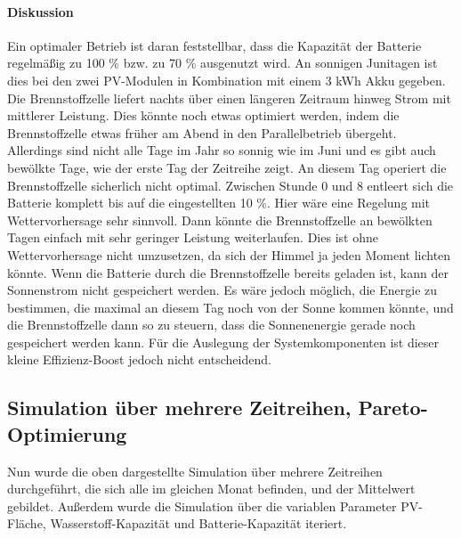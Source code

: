 \paragraph{Diskussion}
Ein optimaler Betrieb ist daran feststellbar, dass die Kapazität der Batterie regelmäßig zu 100 \% bzw. zu 70 \% ausgenutzt wird. An sonnigen Junitagen ist dies bei den zwei PV-Modulen in Kombination mit einem 3 kWh Akku gegeben. Die Brennstoffzelle liefert nachts über einen längeren Zeitraum hinweg Strom mit mittlerer Leistung. Dies könnte noch etwas optimiert werden, indem die Brennstoffzelle etwas früher am Abend in den Parallelbetrieb übergeht. Allerdings sind nicht alle Tage im Jahr so sonnig wie im Juni und es gibt auch bewölkte Tage, wie der erste Tag der Zeitreihe zeigt. An diesem Tag operiert die Brennstoffzelle sicherlich nicht optimal. Zwischen Stunde 0 und 8 entleert sich die Batterie komplett bis auf die eingestellten 10 \%. Hier wäre eine Regelung mit Wettervorhersage sehr sinnvoll. Dann könnte die Brennstoffzelle an bewölkten Tagen einfach mit sehr geringer Leistung weiterlaufen. Dies ist ohne Wettervorhersage nicht umzusetzen, da sich der Himmel ja jeden Moment lichten könnte. Wenn die Batterie durch die Brennstoffzelle bereits geladen ist, kann der Sonnenstrom nicht gespeichert werden. Es wäre jedoch möglich, die Energie zu bestimmen, die maximal an diesem Tag noch von der Sonne kommen könnte, und die Brennstoffzelle dann so zu steuern, dass die Sonnenenergie gerade noch gespeichert werden kann. Für die Auslegung der Systemkomponenten ist dieser kleine Effizienz-Boost jedoch nicht entscheidend.

\subsection{Simulation über mehrere Zeitreihen, Pareto-Optimierung}

Nun wurde die oben dargestellte Simulation über mehrere Zeitreihen durchgeführt, die sich alle im gleichen Monat befinden, und der Mittelwert gebildet. Außerdem wurde die Simulation über die variablen Parameter PV-Fläche, Wasserstoff-Kapazität und Batterie-Kapazität iteriert.

